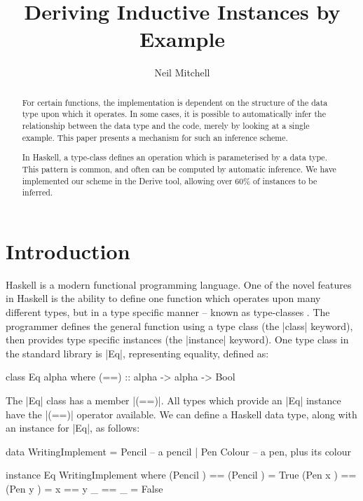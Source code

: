 \documentclass{llncs}
\begin{document}
\title{Deriving Inductive Instances by Example}
\author{Neil Mitchell}


\maketitle

\begin{abstract}
For certain functions, the implementation is dependent on the structure of the data type upon which it operates. In some cases, it is possible to automatically infer the relationship between the data type and the code, merely by looking at a single example. This paper presents a mechanism for such an inference scheme.

In Haskell, a type-class defines an operation which is parameterised by a data type. This pattern is common, and often can be computed by automatic inference. We have implemented our scheme in the Derive tool, allowing over 60\% of instances to be inferred.
\end{abstract}

\section{Introduction}

Haskell \cite{haskell} is a modern functional programming language. One of the novel features in Haskell is the ability to define one function which operates upon many different types, but in a type specific manner -- known as type-classes \cite{wadler:type_classes}. The programmer defines the general function using a type class (the |class| keyword), then provides type specific instances (the |instance| keyword). One type class in the standard library is |Eq|, representing equality, defined as:

\begin{code}
class Eq alpha where
    (==) :: alpha -> alpha -> Bool
\end{code}

The |Eq| class has a member |(==)|. All types which provide an |Eq| instance have the |(==)| operator available. We can define a Haskell data type, along with an instance for |Eq|, as follows:

\begin{code}
data WritingImplement  =  Pencil       -- a pencil
                       |  Pen Colour   -- a pen, plus its colour

instance Eq WritingImplement where
    (Pencil     )  == (Pencil     )  = True
    (Pen     x  )  == (Pen     y  )  = x == y
    _              == _              = False
\end{code}
\end{document}
